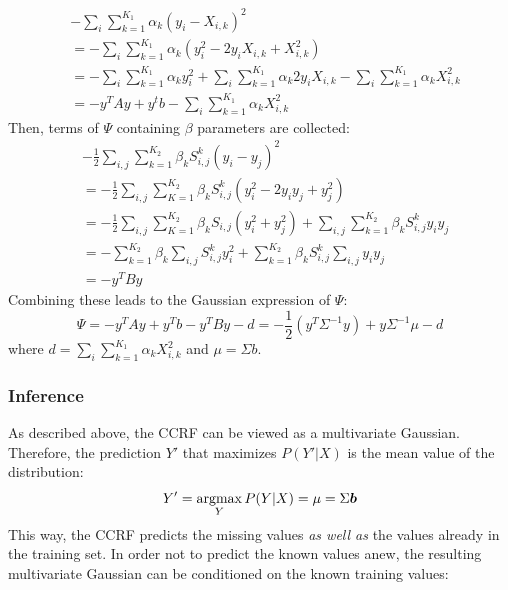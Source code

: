 \begin{equation}
\begin{split}
& -\sum_i \sum \limits_{k=1}^{K_1} \alpha_k(y_i-X_{i,k})^2 \\
& = -\sum_i \sum \limits_{k=1}^{K_1} \alpha_k(y_i^2-2y_iX_{i,k}+X_{i,k}^2) \\
& = -\sum_i \sum \limits_{k=1}^{K_1} \alpha_k y_i^2 + \sum_i \sum\limits_{k=1}^{K_1} \alpha_k 2y_i X_{i,k} - \sum_i \sum\limits_{k=1}^{K_1} \alpha_k X_{i,k}^2\\
& = -y^TAy + y^tb - \sum_i \sum\limits_{k=1}^{K_1} \alpha_k X_{i,k}^2
\end{split}
\end{equation}
Then, terms of $\Psi$ containing $\beta$ parameters are collected:
\begin{equation}
\begin{split}
& -\frac{1}{2}\sum_{i,j}\sum\limits_{k=1}^{K_2}\beta_k S_{i,j}^k(y_i-y_j)^2\\
& = -\frac{1}{2}\sum_{i,j}\sum\limits_{K=1}^{K_2}\beta_k S_{i,j}^k(y_i^2-2y_iy_j+y_j^2)\\
& = -\frac{1}{2}\sum_{i,j}\sum\limits_{K=1}^{K_2}\beta_k S_{i,j}(y_i^2+y_j^2) + \sum_{i,j} \sum\limits_{k=1}^{K_2}\beta_k S_{i,j}^ky_iy_j\\
& =  -\sum\limits_{k=1}^{K_2}\beta_k\sum_{i,j}S_{i,j}^ky_i^2 + \sum\limits_{k=1}^{K_2}\beta_kS_{i,j}^k\sum_{i,j}y_iy_j\\
& = -y^TBy
\end{split}
\end{equation}
Combining these leads to the Gaussian expression of $\Psi$:
\begin{equation}
\Psi=-y^TAy + y^Tb - y^TBy - d = - \frac{1}{2}(y^T\Sigma^{-1}y)+y\Sigma^{-1}\mu - d
\end{equation}
where $d=\sum_i\sum\limits_{k=1}^{K_1}\alpha_kX_{i,k}^2$ and $\mu = \Sigma b$.

\subsubsection{Inference}

As described above, the CCRF can be viewed as a multivariate Gaussian. Therefore, the prediction $Y'$ that maximizes $P(Y'|X)$ is the mean value of the distribution:
\begin{equation}
Y' = \operatorname*{argmax}_{Y} P(Y|X) = \mu = \Sigma\boldsymbol{b}
\end{equation}
This way, the CCRF predicts the missing values \textit{as well as} the values already in the training set. In order not to predict the known values anew, the resulting multivariate Gaussian can be conditioned on the known training values:

